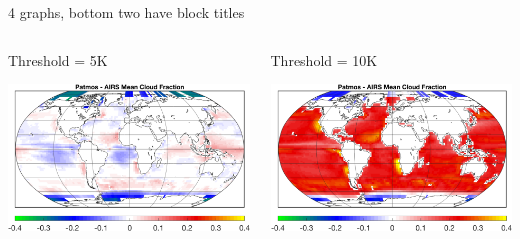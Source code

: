 \documentclass[10pt,t]{beamer}
\begin{document}
\begin{frame}[label={sec:org409cb32}]{4 graphs, bottom two have block titles}
\vspace{-0.2in}

\begin{columns}
\begin{column}{0.55\columnwidth}
\begin{block}{\footnotesize Threshold = 5K}
\vspace{-0.1in}

\begin{center}
\includegraphics[width=\linewidth]{./Figs/patmos_minus_airs_mean_cloud_frac_true5Kcloud.png}
\end{center}
\end{block}
\end{column}

\begin{column}{0.55\columnwidth}
\begin{block}{\footnotesize Threshold = 10K}
\vspace{-0.1in}

\begin{center}
\includegraphics[width=\linewidth]{./Figs/patmos_minus_airs_mean_cloud_frac.png}
\end{center}
\end{block}
\end{column}
\end{columns}
\end{frame}
\end{document}
